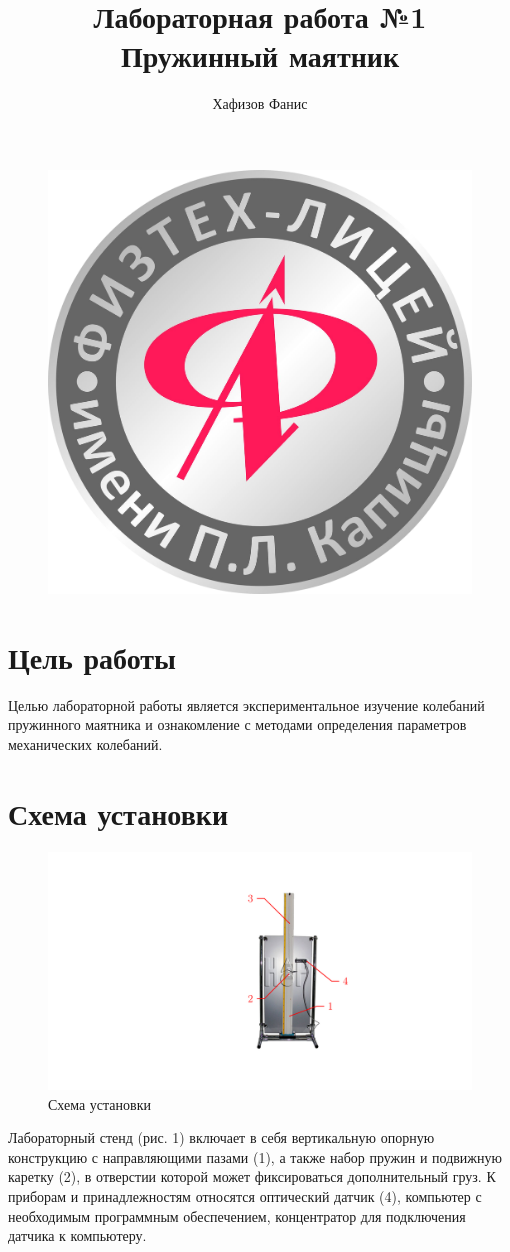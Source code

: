 \documentclass[12pt]{article}
\title{Лабораторная работа №1\\Пружинный маятник}
\author{Хафизов Фанис}
\begin{document}
	\begin{figure}
		\centering
		\includegraphics[width=0.3\linewidth]{logo}
	\end{figure}
	\maketitle
	\newpage
	\section{Цель работы}
	Целью лабораторной работы является экспериментальное изучение колебаний
	пружинного маятника и ознакомление с методами определения параметров механических колебаний.
	\section{Схема установки}
	\begin{figure}[h]
		\centering
		\includegraphics[width=\linewidth]{scheme}
		\caption{Схема установки}
	\end{figure}
Лабораторный стенд (рис. 1) включает в себя вертикальную опорную конструкцию с направляющими пазами (1), а также набор пружин и подвижную каретку
(2), в отверстии которой может фиксироваться дополнительный груз.
К приборам и принадлежностям относятся оптический датчик (4), компьютер с
необходимым программным обеспечением, концентратор для подключения датчика к компьютеру.
\end{document}
